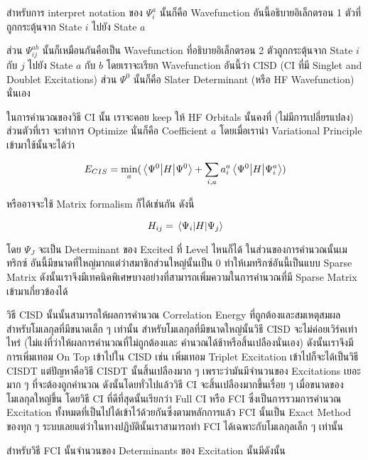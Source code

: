 สำหรับการ interpret notation ของ $\Psi^{a}_{i}$ นั้นก็คือ Wavefunction อันนี้อธิบายอิเล็กตรอน 1
ตัวที่ถูกกระตุ้นจาก State $i$ ไปยัง State $a$

ส่วน $\Psi^{ab}_{ij}$ นั้นก็เหมือนกันคือเป็น Wavefunction ที่อธิบายอิเล็กตรอน 2 ตัวถูกกระตุ้นจาก
State $i$ กับ $j$ ไปยัง State $a$ กับ $b$ โดยเราจะเรียก Wavefunction อันนี้ว่า CISD (CI ที่มี Singlet
and Doublet Excitations) ส่วน $\Psi^{0}$ นั้นก็คือ Slater Determinant (หรือ HF Wavefunction)
นั่นเอง

ในการคำนวณของวิธี CI นั้น เราจะคอย keep ให้ HF Orbitals นั้นคงที่ (ไม่มีการเปลี่ยรแปลง) ส่วนตัวที่เรา%
จะทำการ Optimize นั่นก็คือ Coefficient $a$ โดยเมื่อเรานำ Variational Principle เข้ามาใช้นั้นจะได้ว่า

\begin{equation}
    E_{CIS} = \min_{a} ( \mel{\Psi^{0}}{H}{\Psi^{0}}
    + \sum_{i,a} a^{a}_{i} \mel{\Psi^{0}}{H}{\Psi^{a}_{i}} )
\end{equation}

\noindent หรืออาจจะใช้ Matrix formalism ก็ได้เช่นกัน ดังนี้

\begin{equation}
    H_{ij} = \mel{\Psi_{i}}{H}{\Psi_{j}}
\end{equation}

โดย $\Psi_{J}$ จะเป็น Determinant ของ Excited ที่ Level ไหนก็ได้ ในส่วนของการคำนวณนั้นเมทริกซ์%
อันนี้มีขนาดที่ใหญ่มากแต่ว่าสมาชิกส่วนใหญ่นั้นเป็น 0 ทำให้เมทริกซ์อันนี้เป็นแบบ Sparse Matrix
ดังนั้นเราจึงมีเทคนิคพิเศษบางอย่างที่สามารถเพิ่มความในการคำนวณที่มี Sparse Matrix เข้ามาเกี่ยวข้องได้

วิธี CISD นั้นนั้นสามารถให้ผลการคำนวณ Correlation Energy ที่ถูกต้องและสมเหตุสมผลสำหรับโมเลกุลที่มีขนาดเล็ก ๆ
เท่านั้น สำหรับโมเลกุลที่มีขนาดใหญ่นั้นวิธี CISD จะไม่ค่อยเวิร์คเท่าไหร่ (ไม่แง่ที่ว่าให้ผลการคำนวณที่ไม่ถูกต้องและ%
คำนวณได้ช้าหรือสิ้นเปลืองนั่นเอง) ดังนั้นเราจึงมีการเพิ่มเทอม On Top เข้าไปใน CISD เช่น เพิ่มเทอม Triplet
Excitation เข้าไปก็จะได้เป็นวิธี CISDT แต่ปัญหาคือวิธี CISDT นั้นสิ้นเปลืองมาก ๆ เพราะว่ามันมีจำนวนของ
Excitations เยอะมาก ๆ ที่จะต้องถูกคำนวณ ดังนั้นโดยทั่วไปแล้ววิธี CI จะสิ้นเปลืองมากขึ้นเรื่อย ๆ
เมื่อขนาดของโมเลกุลใหญ่ขึ้น โดยวิธี CI ที่ดีที่สุดนั้นเรียกว่า Full CI หรือ FCI ซึ่งเป็นการรวมการคำนวณ
Excitation ทั้งหมดที่เป็นไปได้เข้าไว้ด้วยกันซึ่งตามหลักการแล้ว FCI นั้นเป็น Exact Method ของทุก ๆ
ระบบเลยแต่ว่าในทางปฏิบัตินั้นเราสามารถทำ FCI ได้เฉพาะกับโมเลกุลเล็ก ๆ เท่านั้น

สำหรับวิธี FCI นั้นจำนวนของ Determinants ของ Excitation นั้นมีดังนั้น

